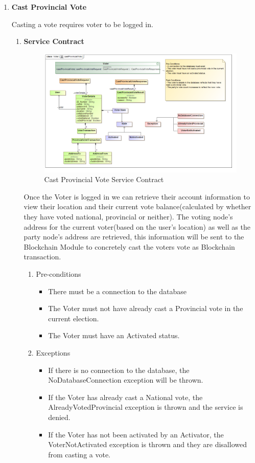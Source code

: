 \begin{enumerate}
	\item \textbf{Cast Provincial Vote}
	
	Casting a vote requires voter to be logged in.
	
	\begin{enumerate}
		\item \textbf{Service Contract}
		\begin{figure}[H]
			\centering
			\includegraphics[width=0.75\linewidth]{../Images/Voter/ServiceContracts/castProvincialVote_serviceContract.png}
			\caption{Cast Provincial Vote Service Contract}
		\end{figure}
		
		Once the Voter is logged in we can retrieve their account information to view their location and their current vote balance(calculated by whether they have voted national, provincial or neither). \newline
		The voting node’s address for the current voter(based on the user’s location) as well as the party node’s address are retrieved, this information will be sent to the Blockchain Module to concretely cast the voters vote as Blockchain transaction.
		\newline				
		
		\begin{enumerate}
			\item Pre-conditions
			\begin{itemize}
				\item There must be a connection to the database
				\item The Voter must not have already cast a Provincial vote in the current election. 
				\item The Voter must have an Activated status.  
			\end{itemize}
			
			\item Exceptions
			\begin{itemize}
				\item If there is no connection to the database, the NoDatabaseConnection exception will be thrown.
				\item If the Voter has already cast a National vote, the AlreadyVotedProvincial exception is thrown and the service is denied.
				\item If the Voter has not been activated by an Activator, the VoterNotActivated exception is thrown and they are disallowed from casting a vote. 
			\end{itemize}
			

\end{enumerate}
\end{enumerate}
\end{enumerate}
